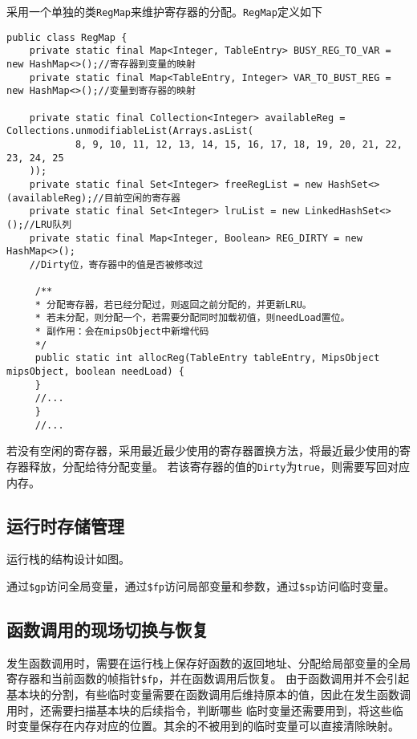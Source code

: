 采用一个单独的类\texttt{RegMap}来维护寄存器的分配。\texttt{RegMap}定义如下
\begin{verbatim}
public class RegMap {
    private static final Map<Integer, TableEntry> BUSY_REG_TO_VAR = new HashMap<>();//寄存器到变量的映射
    private static final Map<TableEntry, Integer> VAR_TO_BUST_REG = new HashMap<>();//变量到寄存器的映射

    private static final Collection<Integer> availableReg = Collections.unmodifiableList(Arrays.asList(
            8, 9, 10, 11, 12, 13, 14, 15, 16, 17, 18, 19, 20, 21, 22, 23, 24, 25
    ));
    private static final Set<Integer> freeRegList = new HashSet<>(availableReg);//目前空闲的寄存器
    private static final Set<Integer> lruList = new LinkedHashSet<>();//LRU队列
    private static final Map<Integer, Boolean> REG_DIRTY = new HashMap<>();
    //Dirty位，寄存器中的值是否被修改过

     /**
     * 分配寄存器，若已经分配过，则返回之前分配的，并更新LRU。
     * 若未分配，则分配一个，若需要分配同时加载初值，则needLoad置位。
     * 副作用：会在mipsObject中新增代码
     */
     public static int allocReg(TableEntry tableEntry, MipsObject mipsObject, boolean needLoad) {
     }
     //...
     }
     //...
\end{verbatim}

若没有空闲的寄存器，采用最近最少使用的寄存器置换方法，将最近最少使用的寄存器释放，分配给待分配变量。
若该寄存器的值的\texttt{Dirty}为\texttt{true}，则需要写回对应内存。

\subsection{运行时存储管理}

运行栈的结构设计如图。
\todo 

通过\texttt{\$gp}访问全局变量，通过\texttt{\$fp}访问局部变量和参数，通过\texttt{\$sp}访问临时变量。

\subsection{函数调用的现场切换与恢复}

发生函数调用时，需要在运行栈上保存好函数的返回地址、分配给局部变量的全局寄存器和当前函数的帧指针\texttt{\$fp}，并在函数调用后恢复。
由于函数调用并不会引起基本块的分割，有些临时变量需要在函数调用后维持原本的值，因此在发生函数调用时，还需要扫描基本块的后续指令，判断哪些
临时变量还需要用到，将这些临时变量保存在内存对应的位置。其余的不被用到的临时变量可以直接清除映射。

